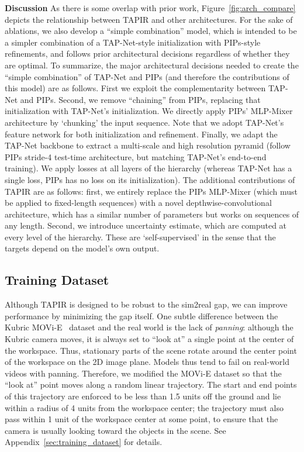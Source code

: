 \documentclass[10pt,twocolumn,letterpaper]{article}
\begin{document}
\noindent \textbf{Discussion} As there is some overlap with prior work, Figure~\ref{fig:arch_compare} depicts the relationship between TAPIR and other architectures.  For the sake of ablations, we also develop a ``simple combination'' model, which is intended to be a simpler combination of a TAP-Net-style initialization with PIPs-style refinements, and follows prior architectural decisions regardless of whether they are optimal.  To summarize, the major architectural decisions needed to create the ``simple combination'' of TAP-Net and PIPs (and therefore the contributions of this model) are as follows.  First we exploit the complementarity between TAP-Net and PIPs.  Second, we remove ``chaining'' from PIPs, replacing that initialization with TAP-Net's initialization.  We directly apply PIPs' MLP-Mixer architecture by `chunking' the input sequence.  Note that we adopt TAP-Net's feature network for both initialization and refinement.  Finally, we adapt the TAP-Net backbone to extract a multi-scale and high resolution pyramid (follow PIPs stride-4 test-time architecture, but matching TAP-Net's end-to-end training).  We apply losses at all layers of the hierarchy (whereas TAP-Net has a single loss, PIPs has no loss on its initialization).  The additional contributions of TAPIR are as follows: first, we entirely replace the PIPs MLP-Mixer (which must be applied to fixed-length sequences) with a novel depthwise-convolutional architecture, which has a similar number of parameters but works on sequences of any length.  Second, we introduce uncertainty estimate, which are computed at every level of the hierarchy.  These are `self-supervised' in the sense that the targets depend on the model's own output.

\subsection{Training Dataset}
Although TAPIR is designed to be robust to the sim2real gap, we can improve performance by minimizing the gap itself.  One subtle difference between the Kubric MOVi-E~\cite{kubric} dataset and the real world is the lack of \emph{panning}: although the Kubric camera moves, it is always set to ``look at'' a single point at the center of the workspace.  Thus, stationary parts of the scene rotate around the center point of the workspace on the 2D image plane.  Models thus tend to fail on real-world videos with panning.  Therefore, we modified the MOVi-E dataset so that the ``look at'' point moves along a random linear trajectory.  The start and end points of this trajectory are enforced to be less than 1.5 units off the ground and lie within a radius of 4 units from the workspace center; the trajectory must also pass within 1 unit of the workspace center at some point, to ensure that the camera is usually looking toward the objects in the scene. See Appendix~\ref{sec:training_dataset} for details.
\end{document}
